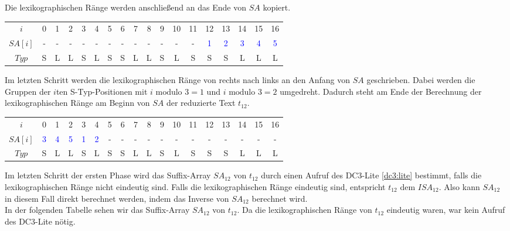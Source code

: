 Die lexikographischen Ränge werden anschließend an das Ende von $SA$ kopiert.

\begin{table}[H]
	\footnotesize
	\centering
	\begin{tabular}{c| c c c c c c c c c c c c c c c c c}
		$i$ & 0 & 1 & 2 & 3 & 4 & 5 & 6 & 7 & 8 & 9 & 10 & 11 & 12 & 13 & 14 & 15 & 16 \\
		$SA[i]$ & - & - & - & - & - & - & - & - & - & - & - & - & \textcolor{blue}{1} & \textcolor{blue}{2} & \textcolor{blue}{3} & \textcolor{blue}{4} & \textcolor{blue}{5} \\
		$Typ$ & S & L & L & S & L & S & S & L & L & S & L & S & S & S & L & L & L
	\end{tabular}
\end{table}

Im letzten Schritt werden die lexikographischen Ränge von rechts nach links an den Anfang von $SA$ geschrieben. Dabei werden die Gruppen der $i$ten S-Typ-Positionen mit $i \text{ modulo } 3 = 1$ und $i \text{ modulo } 3 = 2$ umgedreht. Dadurch steht am Ende der Berechnung der lexikographischen Ränge am Beginn von $SA$ der reduzierte Text $t_{12}$.

\begin{table}[H]
	\footnotesize
	\centering
	\begin{tabular}{c| c c c c c c c c c c c c c c c c c}
		$i$ & 0 & 1 & 2 & 3 & 4 & 5 & 6 & 7 & 8 & 9 & 10 & 11 & 12 & 13 & 14 & 15 & 16 \\
		$SA[i]$ & \textcolor{blue}{3} & \textcolor{blue}{4} & \textcolor{blue}{5} & \textcolor{blue}{1} & \textcolor{blue}{2} & - & - & - & - & - & - & - & - & - & - & - & - \\
		$Typ$ & S & L & L & S & L & S & S & L & L & S & L & S & S & S & L & L & L
	\end{tabular}
\end{table}

Im letzten Schritt der ersten Phase wird das Suffix-Array $SA_{12}$ von $t_{12}$ durch einen Aufruf des DC3-Lite \cref{dc3:lite} bestimmt, falls die lexikographischen Ränge nicht eindeutig sind. Falls die lexikographischen Ränge eindeutig sind, entspricht $t_{12}$ dem $ISA_{12}$. Also kann $SA_{12}$ in diesem Fall direkt berechnet werden, indem das Inverse von $SA_{12}$ berechnet wird. \\
In der folgenden Tabelle sehen wir das Suffix-Array $SA_{12}$ von $t_{12}$. Da die lexikographischen Ränge von $t_{12}$ eindeutig waren, war kein Aufruf des DC3-Lite nötig.

